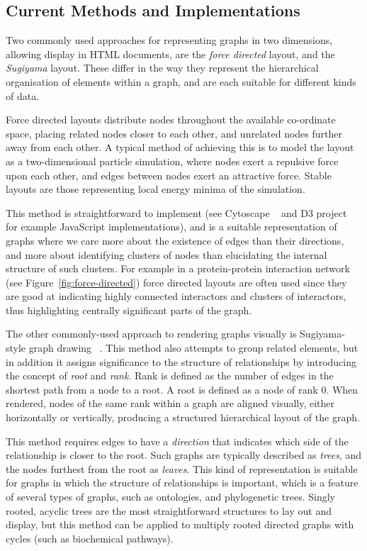 \documentclass[10pt,a4paper,twocolumn]{article}
\begin{document}
\subsection*{Current Methods and Implementations}

Two commonly used approaches for representing graphs in two dimensions, allowing
display in HTML documents, are the \emph{force directed} layout, and the
\emph{Sugiyama} layout. These differ in the way they represent the hierarchical
organisation of elements within a graph, and are each suitable for different
kinds of data.

Force directed layouts distribute nodes throughout the available co-ordinate
space, placing related nodes closer to each other, and unrelated nodes further
away from each other. A typical method of achieving this is to model the layout
as a two-dimensional particle simulation, where nodes exert a repulsive force
upon each other, and edges between nodes exert an attractive force. Stable
layouts are those representing local energy minima of the simulation. 

This method is straightforward to implement (see Cytoscape ~\cite{cytoscape}
and D3 project ~\cite{d3} for example JavaScript implementations), and is a
suitable representation of graphs where we care more about the existence of
edges than their directions, and more about identifying clusters of nodes than
elucidating the internal structure of such clusters. For example in a
protein-protein interaction network (see Figure~\ref{fig:force-directed}) force
directed layouts are often used since they are good at indicating highly
connected interactors and clusters of interactors, thus highlighting centrally
significant parts of the graph. 

The other commonly-used approach to rendering graphs visually is Sugiyama-style
graph drawing ~\cite{sugiyama}. This method also attempts to group related
elements, but in addition it assigns significance to the structure of
relationships by introducing the concept of \emph{root} and \emph{rank}. Rank is
defined as the number of edges in the shortest path from a node to a root. A
root is defined as a node of rank 0. When rendered, nodes of the same rank
within a graph are aligned visually, either horizontally or vertically,
producing a structured hierarchical layout of the graph.

This method requires edges to have a \emph{direction} that indicates which side
of the relationship is closer to the root. Such graphs are typically described
as \emph{trees}, and the nodes furthest from the root as \emph{leaves}.  This
kind of representation is suitable for graphs in which the structure of
relationships is important, which is a feature of several types of graphs, such
as ontologies, and phylogenetic trees. Singly rooted, acyclic trees are the most
straightforward structures to lay out and display, but this method can be
applied to multiply rooted directed graphs with cycles (such as biochemical
pathways). 
\end{document}
